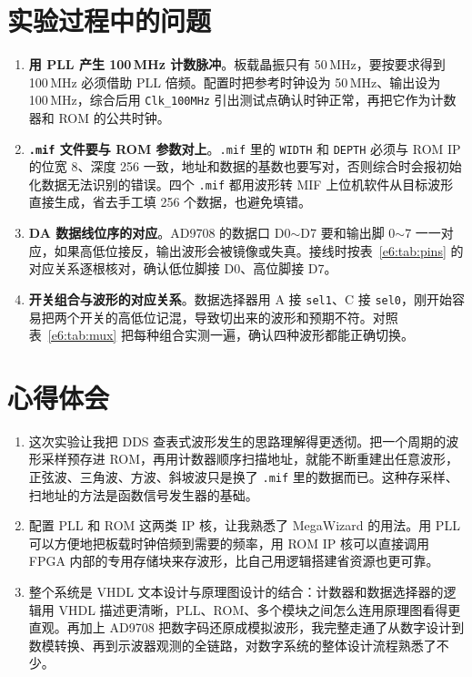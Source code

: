 \documentclass{ctexrep}
\begin{document}
\section{实验过程中的问题}

\begin{enumerate}
    \item \textbf{用 PLL 产生 100\,MHz 计数脉冲}。板载晶振只有 50\,MHz，要按要求得到 100\,MHz 必须借助 PLL 倍频。配置时把参考时钟设为 50\,MHz、输出设为 100\,MHz，综合后用 \texttt{Clk\_100MHz} 引出测试点确认时钟正常，再把它作为计数器和 ROM 的公共时钟。
    \item \textbf{\texttt{.mif} 文件要与 ROM 参数对上}。\texttt{.mif} 里的 \texttt{WIDTH} 和 \texttt{DEPTH} 必须与 ROM IP 的位宽 8、深度 256 一致，地址和数据的基数也要写对，否则综合时会报初始化数据无法识别的错误。四个 \texttt{.mif} 都用波形转 MIF 上位机软件从目标波形直接生成，省去手工填 256 个数据，也避免填错。
    \item \textbf{DA 数据线位序的对应}。AD9708 的数据口 D0$\sim$D7 要和输出脚 0$\sim$7 一一对应，如果高低位接反，输出波形会被镜像或失真。接线时按表~\ref{e6:tab:pins} 的对应关系逐根核对，确认低位脚接 D0、高位脚接 D7。
    \item \textbf{开关组合与波形的对应关系}。数据选择器用 A 接 \texttt{sel1}、C 接 \texttt{sel0}，刚开始容易把两个开关的高低位记混，导致切出来的波形和预期不符。对照表~\ref{e6:tab:mux} 把每种组合实测一遍，确认四种波形都能正确切换。
\end{enumerate}

\section{心得体会}

\begin{enumerate}
    \item 这次实验让我把 DDS 查表式波形发生的思路理解得更透彻。把一个周期的波形采样预存进 ROM，再用计数器顺序扫描地址，就能不断重建出任意波形，正弦波、三角波、方波、斜坡波只是换了 \texttt{.mif} 里的数据而已。这种存采样、扫地址的方法是函数信号发生器的基础。
    \item 配置 PLL 和 ROM 这两类 IP 核，让我熟悉了 MegaWizard 的用法。用 PLL 可以方便地把板载时钟倍频到需要的频率，用 ROM IP 核可以直接调用 FPGA 内部的专用存储块来存波形，比自己用逻辑搭建省资源也更可靠。
    \item 整个系统是 VHDL 文本设计与原理图设计的结合：计数器和数据选择器的逻辑用 VHDL 描述更清晰，PLL、ROM、多个模块之间怎么连用原理图看得更直观。再加上 AD9708 把数字码还原成模拟波形，我完整走通了从数字设计到数模转换、再到示波器观测的全链路，对数字系统的整体设计流程熟悉了不少。
\end{enumerate}
\end{document}
